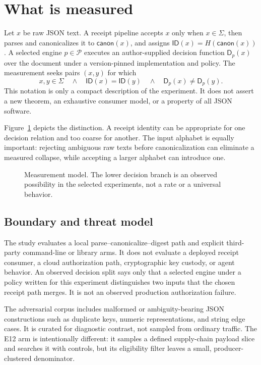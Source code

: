 \documentclass[10pt,twocolumn,letterpaper]{article}
\newcommand{\identity}{\mathsf{ID}}
\newcommand{\decision}{\mathsf{D}}
\newcommand{\canon}{\mathsf{canon}}
\newcommand{\admitted}{\Sigma}
\newcommand{\engines}{\mathcal{P}}
\begin{document}
\section{What is measured}
\label{sec:model}

Let $x$ be raw JSON text.  A receipt pipeline accepts $x$ only when
$x\in\admitted$, then parses and canonicalizes it to $\canon(x)$, and assigns
$\identity(x)=H(\canon(x))$.  A selected engine $p\in\engines$ executes an
author-supplied decision function $\decision_p(x)$ over the document under a
version-pinned implementation and policy.  The measurement seeks pairs
$(x,y)$ for which
\[
 x,y\in\admitted \quad\land\quad \identity(x)=\identity(y)
 \quad\land\quad \decision_p(x)\ne\decision_p(y).
\]
This notation is only a compact description of the experiment.  It does not
assert a new theorem, an exhaustive consumer model, or a property of all JSON
software.

Figure~\ref{fig:model} depicts the distinction.  A receipt identity can be
appropriate for one decision relation and too coarse for another.  The input
alphabet is equally important: rejecting ambiguous raw texts before
canonicalization can eliminate a measured collapse, while accepting a larger
alphabet can introduce one.

\begin{figure}[t]
  \centering
  \resizebox{0.92\textwidth}{!}{}
  \caption{Measurement model.  The lower decision branch is an observed
  possibility in the selected experiments, not a rate or a universal
  behavior.}
  \label{fig:model}
\end{figure}

\subsection{Boundary and threat model}

The study evaluates a local parse--canonicalize--digest path and explicit
third-party command-line or library arms.  It does not evaluate a deployed
receipt consumer, a cloud authorization path, cryptographic key custody, or
agent behavior.  An observed decision split says only that a selected engine
under a policy written for this experiment distinguishes two inputs that the
chosen receipt path merges.  It is not an observed production authorization
failure.

The adversarial corpus includes malformed or ambiguity-bearing JSON
constructions such as duplicate keys, numeric representations, and string
edge cases.  It is curated for diagnostic contrast, not sampled from ordinary
traffic.  The E12 arm is intentionally different: it samples a defined
supply-chain payload slice and searches it with controls, but its eligibility
filter leaves a small, producer-clustered denominator.
\end{document}
